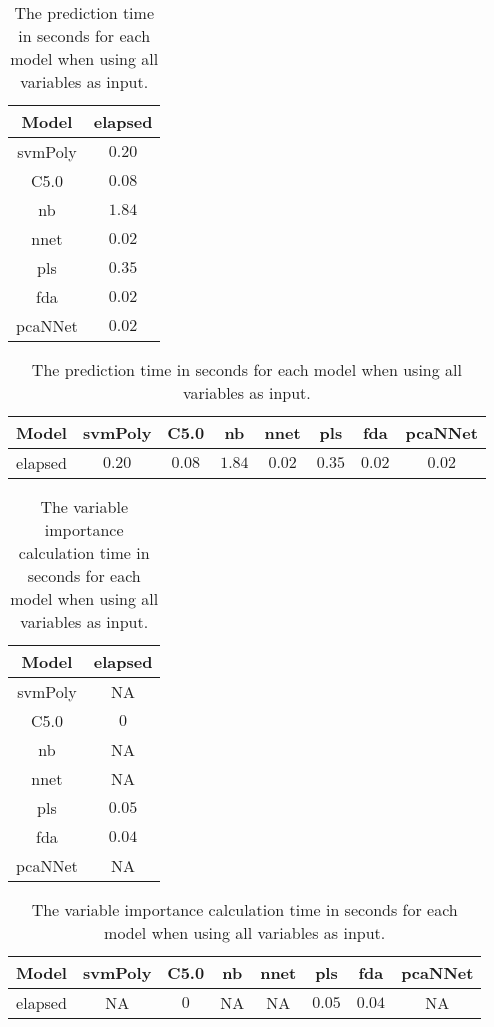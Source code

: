 \begin{table}[!ht]
	\centering
	\begin{tabular}{|c|c|}
		\hline
		Model & elapsed \\ \hline
		svmPoly & $0.20$ \\ \hline
		C5.0 & $0.08$ \\ \hline
		nb & $1.84$ \\ \hline
		nnet & $0.02$ \\ \hline
		pls & $0.35$ \\ \hline
		fda & $0.02$ \\ \hline
		pcaNNet & $0.02$ \\ \hline
	\end{tabular}
	\caption{The prediction time in seconds for each model when using all variables as input.}
	\label{tab:time:all:predict}
\end{table}

\begin{table}[!ht]
	\centering
	\begin{tabular}{|c|c|c|c|c|c|c|c|}
		\hline
		Model & svmPoly & C5.0 & nb & nnet & pls & fda & pcaNNet \\ \hline
		elapsed & $0.20$ & $0.08$ & $1.84$ & $0.02$ & $0.35$ & $0.02$ & $0.02$ \\ \hline
	\end{tabular}
	\caption{The prediction time in seconds for each model when using all variables as input.}
	\label{tab:time:reverse:all:predict}
\end{table}

\begin{table}[!ht]
	\centering
	\begin{tabular}{|c|c|}
		\hline
		Model & elapsed \\ \hline
		svmPoly & NA \\ \hline
		C5.0 & $0$ \\ \hline
		nb & NA \\ \hline
		nnet & NA \\ \hline
		pls & $0.05$ \\ \hline
		fda & $0.04$ \\ \hline
		pcaNNet & NA \\ \hline
	\end{tabular}
	\caption{The variable importance calculation time in seconds for each model when using all variables as input.}
	\label{tab:time:all:importance}
\end{table}

\begin{table}[!ht]
	\centering
	\begin{tabular}{|c|c|c|c|c|c|c|c|}
		\hline
		Model & svmPoly & C5.0 & nb & nnet & pls & fda & pcaNNet \\ \hline
		elapsed & NA & $0$ & NA & NA & $0.05$ & $0.04$ & NA \\ \hline
	\end{tabular}
	\caption{The variable importance calculation time in seconds for each model when using all variables as input.}
	\label{tab:time:reverse:all:importance}
\end{table}

